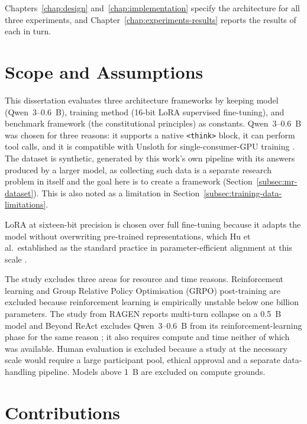 Chapters~\ref{chap:design} and~\ref{chap:implementation} specify the architecture for all three experiments, and Chapter~\ref{chap:experiments-results} reports the results of each in turn.

\section{Scope and Assumptions}
\label{sec:scope-and-assumptions}

This dissertation evaluates three architecture frameworks by keeping model (Qwen~3--0.6~B), training method (16-bit LoRA supervised fine-tuning), and benchmark framework (the constitutional principles) as constants. Qwen~3--0.6~B was chosen for three reasons: it supports a native \texttt{<think>} block, it can perform tool calls, and it is compatible with Unsloth for single-consumer-GPU training \cite{yang2025qwen3technicalreport}. The dataset is synthetic, generated by this work's own pipeline with its answers produced by a larger model, as collecting such data is a separate research problem in itself and the goal here is to create a framework (Section~\ref{subsec:mr-dataset}). This is also noted as a limitation in Section~\ref{subsec:training-data-limitations}.

LoRA at sixteen-bit precision is chosen over full fine-tuning because it adapts the model without overwriting pre-trained representations, which Hu et al.\ established as the standard practice in parameter-efficient alignment at this scale \cite{hu2021loralowrankadaptationlarge}. 

The study excludes three areas for resource and time reasons. Reinforcement learning and Group Relative Policy Optimisation (GRPO) post-training are excluded because reinforcement learning is empirically unstable below one billion parameters. The study from RAGEN reports multi-turn collapse on a 0.5~B model \cite{wang2025ragenunderstandingselfevolutionllm} and Beyond ReAct excludes Qwen~3--0.6~B from its reinforcement-learning phase for the same reason \cite{wei2025reactplannercentricframeworkcomplex}; it also requires compute and time neither of which was available. Human evaluation is excluded because a study at the necessary scale would require a large participant pool, ethical approval and a separate data-handling pipeline. Models above 1~B are excluded on compute grounds.

\section{Contributions}
\label{sec:contributions}

